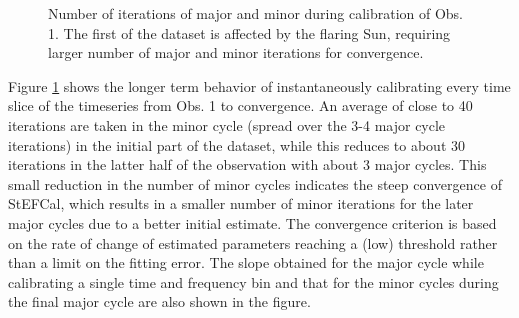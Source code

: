 \documentclass{aa}
\begin{document}
\begin{figure}[tbh]

\caption{\label{fig:Major-and-minor}Number  of  iterations  of major  and  minor
  during calibration  of Obs.  1. The first  of the  dataset is affected  by the
  flaring  Sun,  requiring larger  number  of  major  and minor  iterations  for
  convergence.}
\end{figure}


Figure   \ref{fig:Major-and-minor}   shows   the   longer  term   behavior   of
instantaneously calibrating  every time slice  of the timeseries  from Obs.  1 to
convergence. An average  of close to 40 iterations are taken  in the minor cycle
(spread over the 3-4 major cycle iterations) in the initial part of the dataset,
while this reduces to about 30  iterations in the latter half of the observation
with about  3 major cycles. This small  reduction in the number  of minor cycles
indicates the steep convergence of StEFCal, which results in a smaller number of
minor  iterations  for   the  later  major  cycles  due   to  a  better  initial
estimate. The convergence criterion is based  on the rate of change of estimated
parameters  reaching a  (low)  threshold rather  than  a limit  on the  fitting
error. The  slope obtained for the  major cycle while calibrating  a single time
and frequency  bin and that for the  minor cycles during the  final major cycle
are also shown in the figure.
\end{document}
